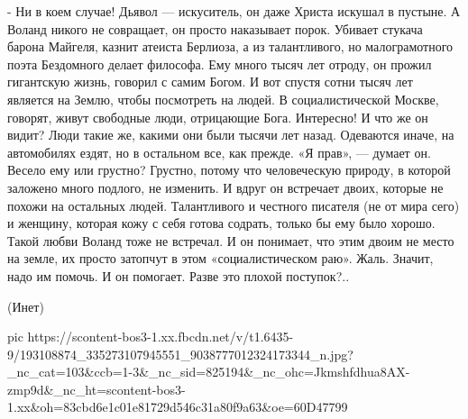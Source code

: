 - Ни в коем случае! Дьявол — искуситель, он даже Христа искушал в пустыне. А
Воланд никого не совращает, он просто наказывает порок. Убивает стукача барона
Майгеля, казнит атеиста Берлиоза, а из талантливого, но малограмотного поэта
Бездомного делает философа. Ему много тысяч лет отроду, он прожил гигантскую
жизнь, говорил с самим Богом. И вот спустя сотни тысяч лет является на Землю,
чтобы посмотреть на людей. В социалистической Москве, говорят, живут свободные
люди, отрицающие Бога. Интересно! И что же он видит? Люди такие же, какими они
были тысячи лет назад. Одеваются иначе, на автомобилях ездят, но в остальном
все, как прежде. «Я прав», — думает он. Весело ему или грустно? Грустно, потому
что человеческую природу, в которой заложено много подлого, не изменить. И
вдруг он встречает двоих, которые не похожи на остальных людей. Талантливого и
честного писателя (не от мира сего) и женщину, которая кожу с себя готова
содрать, только бы ему было хорошо. Такой любви Воланд тоже не встречал. И он
понимает, что этим двоим не место на земле, их просто затопчут в этом
«социалистическом раю». Жаль. Значит, надо им помочь. И он помогает. Разве это
плохой поступок?..

(Инет)

\ifcmt
  pic https://scontent-bos3-1.xx.fbcdn.net/v/t1.6435-9/193108874_335273107945551_9038777012324173344_n.jpg?_nc_cat=103&ccb=1-3&_nc_sid=825194&_nc_ohc=Jkmshfdhua8AX-zmp9d&_nc_ht=scontent-bos3-1.xx&oh=83cbd6e1c01e81729d546c31a80f9a63&oe=60D47799
\fi
